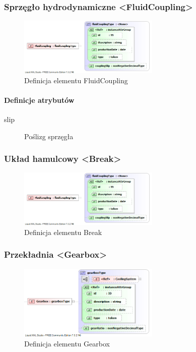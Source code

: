 \documentclass[12pt,a4paper]{article}
\begin{document}
\subsubsection{Sprzęgło hydrodynamiczne <FluidCoupling>}

\begin{figure}[H]
  \centering
  \includegraphics[width=0.6\textwidth]{png/liquid/FluidCoupling}
  \caption{Definicja elementu FluidCoupling}
  \label{fig:fluidCoupling-xsd}
\end{figure}

\paragraph{Definicje atrybutów}
\begin{description}
\item[slip] Poślizg sprzęgła
\end{description}


\subsubsection{Układ hamulcowy <Break>}

\begin{figure}[H]
  \centering
  \includegraphics[width=0.6\textwidth]{png/liquid/FluidCoupling}
  \caption{Definicja elementu Break}
  \label{fig:break-xsd}
\end{figure}


\subsubsection{Przekładnia <Gearbox>}

\begin{figure}[H]
  \centering
  \includegraphics[width=0.6\textwidth]{png/liquid/Gearbox}
  \caption{Definicja elementu Gearbox}
  \label{fig:gearbox-xsd}
\end{figure}
\end{document}
